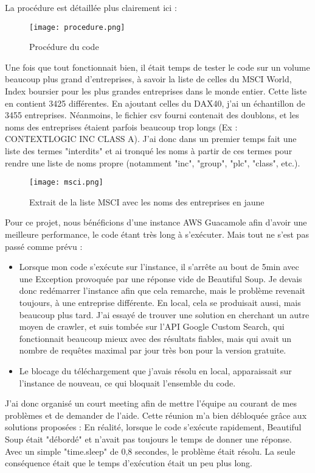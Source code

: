 La procédure est détaillée plus clairement ici :
\begin{figure}[H]
    \centering
    \texttt{[image: procedure.png]}
    \caption{Procédure du code}
\end{figure}

Une fois que tout fonctionnait bien, il était temps de tester le code sur un volume beaucoup plus grand d'entreprises, à savoir la liste de celles du MSCI World, Index boursier pour les plus grandes entreprises dans le monde entier.
Cette liste en contient 3425 différentes. En ajoutant celles du DAX40, j'ai un échantillon de 3455 entreprises. 
Néanmoins, le fichier csv fourni contenait des doublons, et les noms des entreprises étaient parfois beaucoup trop longs (Ex : CONTEXTLOGIC INC CLASS A).
J'ai donc dans un premier temps fait une liste des termes "interdits" et ai tronqué les noms à partir de ces termes pour rendre une liste de noms propre (notamment "inc", "group", "plc", "class", etc.).

\begin{figure}[H]
    \centering
    \texttt{[image: msci.png]}
    \caption{Extrait de la liste MSCI avec les noms des entreprises en jaune}
\end{figure}

Pour ce projet, nous bénéficions d'une instance AWS Guacamole afin d'avoir une meilleure performance, le code étant très long à s'exécuter.
Mais tout ne s'est pas passé comme prévu : 
\begin{itemize}
    \item Lorsque mon code s'exécute sur l'instance, il s'arrête au bout de 5min avec une Exception provoquée par une réponse vide de Beautiful Soup.
    Je devais donc redémarrer l'instance afin que cela remarche, mais le problème revenait toujours, à une entreprise différente. En local, cela se produisait aussi, mais beaucoup plus tard.
    J'ai essayé de trouver une solution en cherchant un autre moyen de crawler, et suis tombée sur l'API Google Custom Search, qui fonctionnait beaucoup mieux avec des résultats fiables, mais qui avait un nombre de requêtes maximal par jour très bon pour la version gratuite.
    \item Le blocage du téléchargement que j'avais résolu en local, apparaissait sur l'instance de nouveau, ce qui bloquait l'ensemble du code.
\end{itemize}

J'ai donc organisé un court meeting afin de mettre l'équipe au courant de mes problèmes et de demander de l'aide.
Cette réunion m'a bien débloquée grâce aux solutions proposées :
En réalité, lorsque le code s'exécute rapidement, Beautiful Soup était "débordé" et n'avait pas toujours le temps de donner une réponse.
Avec un simple "time.sleep" de 0,8 secondes, le problème était résolu. La seule conséquence était que le temps d'exécution était un peu plus long.

